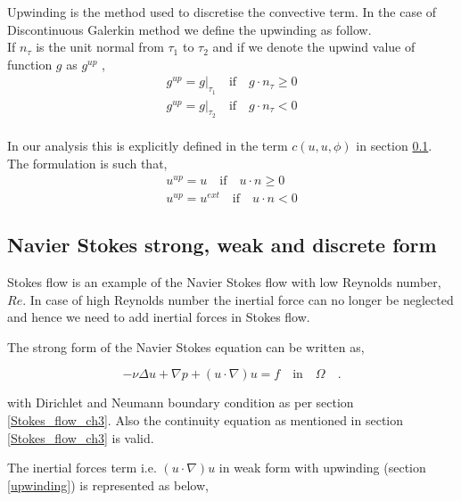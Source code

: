 \documentclass[a4paper]{book}
\begin{document}
Upwinding is the method used to discretise the convective term. In the case of Discontinuous Galerkin method we define the upwinding as follow.\\

If $n_\tau$ is the unit normal from $\tau_1$ to $\tau_2$ and if we denote the upwind value of function $g$ as $g^{up}$ \cite{riviere},
\begin{equation}
\begin{split}
g^{up} = g|_{\tau_1} \quad \textrm{if} \quad g \cdot n_\tau \geq 0 \\
g^{up} = g|_{\tau_2} \quad \textrm{if} \quad g \cdot n_\tau < 0
\end{split}
\end{equation}
\\
In our analysis this is explicitly defined in the term $c(u,u,\phi)$ in section \ref{n_s_ch3}. The formulation is such that,
\begin{equation}
\begin{split}
u^{up} = u \quad \textrm{if} \quad u \cdot n \geq 0 \\
u^{up} = u^{ext} \quad \textrm{if} \quad u \cdot n < 0
\end{split}
\end{equation}

\subsection{Navier Stokes strong, weak and discrete form} \label{n_s_ch3}

Stokes flow is an example of the Navier Stokes flow with low Reynolds number, $Re$. In case of high Reynolds number the inertial force can no longer be neglected and hence we need to add inertial forces in Stokes flow. 

The strong form of the Navier Stokes equation can be written as,

\begin{equation} \label{navier_stokes_strong_ch3}
-\nu \Delta u + \nabla p + (u \cdot \nabla) u = f \quad \textrm{in} \quad \Omega \quad \textrm{.}
\end{equation}

with Dirichlet and Neumann boundary condition as per section \ref{Stokes_flow_ch3}. Also the continuity equation as mentioned in section \ref{Stokes_flow_ch3} is valid.

The inertial forces term i.e. $(u \cdot \nabla) u$ in weak form with upwinding (section \ref{upwinding}) is represented as below,
\end{document}
